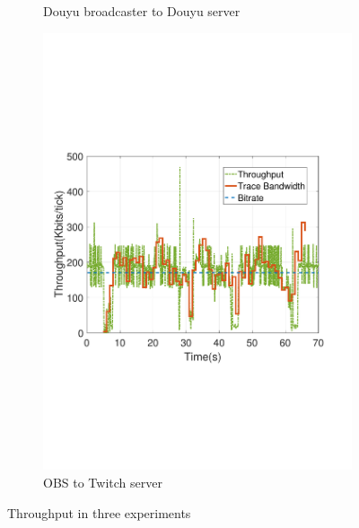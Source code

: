\begin{figure}[htb]
\begin{subfigure}[b]{0.32\textwidth}
  \caption{Douyu broadcaster to Douyu server}
  \label{fig:douyu}
\end{subfigure}
\begin{subfigure}[b]{0.32\textwidth}%
  \includegraphics[width=0.8\linewidth]{fig/obs_twitch.pdf}
  \caption{OBS to Twitch server}
  \label{fig:obs-twitch}
\end{subfigure}
\caption{Throughput in three experiments}\label{fig:commerical-throughput}
\end{figure}


